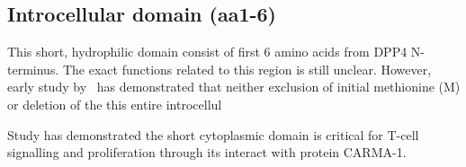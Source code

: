 \subsection{Introcellular domain (aa1-6)}

This short, hydrophilic domain consist of first 6 amino acids from DPP4 N-terminus. The exact functions related to this region is still unclear. However, early study by~\citet{Hong1990} has demonstrated that neither exclusion of initial methionine (M) or deletion of the this entire introcellul

Study has demonstrated the short cytoplasmic domain is critical for T-cell signalling and proliferation through its interact with protein CARMA-1. \cite{Ohnuma_2007}